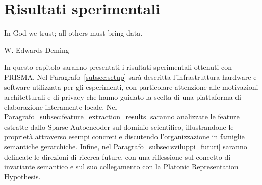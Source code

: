 \section{Risultati sperimentali}
\label{sec:06_risultati}

\epigraph{
    In God we trust; all others must bring data.
}{W. Edwards Deming}

In questo capitolo saranno presentati i risultati sperimentali ottenuti con PRISMA. Nel Paragrafo~\ref{subsec:setup} sarà descritta l'infrastruttura hardware e software utilizzata per gli esperimenti, con particolare attenzione alle motivazioni architetturali e di privacy che hanno guidato la scelta di una piattaforma di elaborazione interamente locale. Nel Paragrafo~\ref{subsec:feature_extraction_results} saranno analizzate le feature estratte dallo Sparse Autoencoder sul dominio scientifico, illustrandone le proprietà attraverso esempi concreti e discutendo l'organizzazione in famiglie semantiche gerarchiche. Infine, nel Paragrafo~\ref{subsec:sviluppi_futuri} saranno delineate le direzioni di ricerca future, con una riflessione sul concetto di invariante semantico e sul suo collegamento con la Platonic Representation Hypothesis.

\newpage

